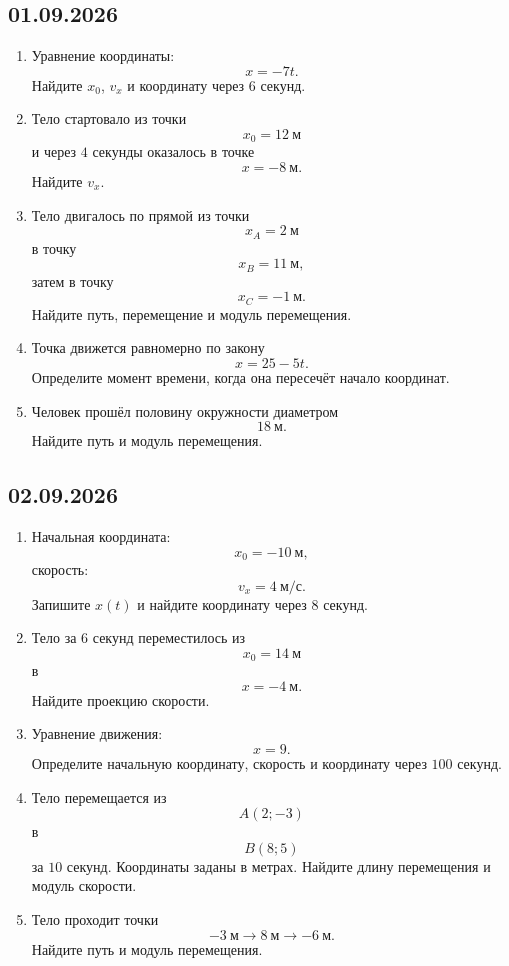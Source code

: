 \documentclass[a4paper,12pt]{article}
\begin{document}
\subsection*{01.09.2026}

\begin{enumerate}[label=\textbf{\arabic*)}]
  \item Уравнение координаты:
  \[
  x=-7t.
  \]
  Найдите \(x_0\), \(v_x\) и координату через \(6\) секунд.

  \item Тело стартовало из точки
  \[
  x_0=12~\text{м}
  \]
  и через \(4\) секунды оказалось в точке
  \[
  x=-8~\text{м}.
  \]
  Найдите \(v_x\).

  \item Тело двигалось по прямой из точки
  \[
  x_A=2~\text{м}
  \]
  в точку
  \[
  x_B=11~\text{м},
  \]
  затем в точку
  \[
  x_C=-1~\text{м}.
  \]
  Найдите путь, перемещение и модуль перемещения.

  \item Точка движется равномерно по закону
  \[
  x=25-5t.
  \]
  Определите момент времени, когда она пересечёт начало координат.

  \item Человек прошёл половину окружности диаметром
  \[
  18~\text{м}.
  \]
  Найдите путь и модуль перемещения.
\end{enumerate}

\subsection*{02.09.2026}

\begin{enumerate}[label=\textbf{\arabic*)}]
  \item Начальная координата:
  \[
  x_0=-10~\text{м},
  \]
  скорость:
  \[
  v_x=4~\text{м/с}.
  \]
  Запишите \(x(t)\) и найдите координату через \(8\) секунд.

  \item Тело за \(6\) секунд переместилось из
  \[
  x_0=14~\text{м}
  \]
  в
  \[
  x=-4~\text{м}.
  \]
  Найдите проекцию скорости.

  \item Уравнение движения:
  \[
  x=9.
  \]
  Определите начальную координату, скорость и координату через \(100\) секунд.

  \item Тело перемещается из
  \[
  A(2;-3)
  \]
  в
  \[
  B(8;5)
  \]
  за \(10\) секунд. Координаты заданы в метрах.
  Найдите длину перемещения и модуль скорости.

  \item Тело проходит точки
  \[
  -3~\text{м}\to 8~\text{м}\to -6~\text{м}.
  \]
  Найдите путь и модуль перемещения.
\end{enumerate}
\end{document}
